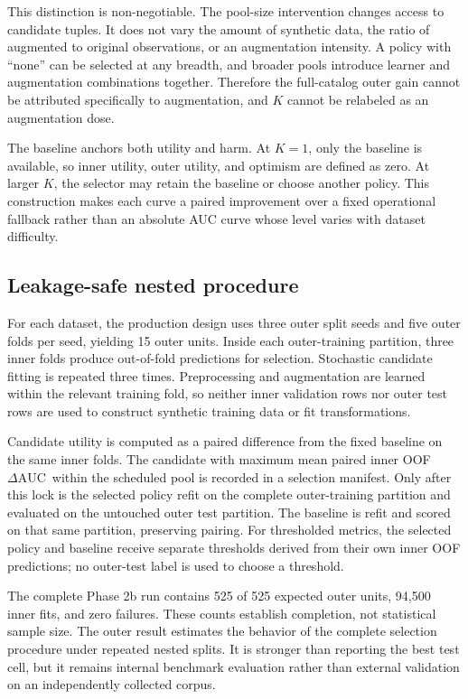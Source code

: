 \documentclass[referee]{USG}
\newcommand{\dauc}{\ensuremath{\Delta\mathrm{AUC}}}
\begin{document}
This distinction is non-negotiable. The pool-size intervention changes access to candidate tuples. It does not vary the amount of synthetic data, the ratio of augmented to original observations, or an augmentation intensity. A policy with ``none'' can be selected at any breadth, and broader pools introduce learner and augmentation combinations together. Therefore the full-catalog outer gain cannot be attributed specifically to augmentation, and $K$ cannot be relabeled as an augmentation dose.

The baseline anchors both utility and harm. At $K=1$, only the baseline is available, so inner utility, outer utility, and optimism are defined as zero. At larger $K$, the selector may retain the baseline or choose another policy. This construction makes each curve a paired improvement over a fixed operational fallback rather than an absolute AUC curve whose level varies with dataset difficulty.

\subsection{Leakage-safe nested procedure}
For each dataset, the production design uses three outer split seeds and five outer folds per seed, yielding 15 outer units. Inside each outer-training partition, three inner folds produce out-of-fold predictions for selection. Stochastic candidate fitting is repeated three times. Preprocessing and augmentation are learned within the relevant training fold, so neither inner validation rows nor outer test rows are used to construct synthetic training data or fit transformations.

Candidate utility is computed as a paired difference from the fixed baseline on the same inner folds. The candidate with maximum mean paired inner OOF \dauc\ within the scheduled pool is recorded in a selection manifest. Only after this lock is the selected policy refit on the complete outer-training partition and evaluated on the untouched outer test partition. The baseline is refit and scored on that same partition, preserving pairing. For thresholded metrics, the selected policy and baseline receive separate thresholds derived from their own inner OOF predictions; no outer-test label is used to choose a threshold.

The complete Phase 2b run contains 525 of 525 expected outer units, 94,500 inner fits, and zero failures. These counts establish completion, not statistical sample size. The outer result estimates the behavior of the complete selection procedure under repeated nested splits. It is stronger than reporting the best test cell, but it remains internal benchmark evaluation rather than external validation on an independently collected corpus.
\end{document}
